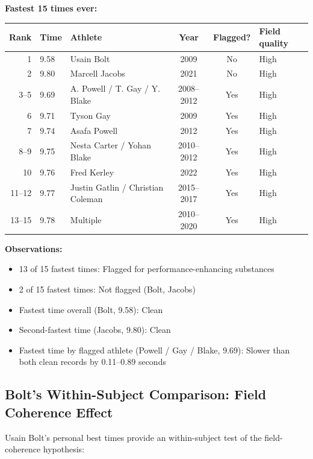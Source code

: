 \documentclass[11pt,twocolumn]{article}
\theoremstyle{definition}
\theoremstyle{remark}
\begin{document}
\textbf{Fastest 15 times ever:}
\begin{center}
\small
\begin{tabular}{rllccl}
\toprule
\textbf{Rank} & \textbf{Time} & \textbf{Athlete} & \textbf{Year} & \textbf{Flagged?} & \textbf{Field quality} \\
\midrule
1 & 9.58 & Usain Bolt & 2009 & No & High \\
2 & 9.80 & Marcell Jacobs & 2021 & No & High \\
3--5 & 9.69 & A. Powell / T. Gay / Y. Blake & 2008--2012 & Yes & High \\
6 & 9.71 & Tyson Gay & 2009 & Yes & High \\
7 & 9.74 & Asafa Powell & 2012 & Yes & High \\
8--9 & 9.75 & Nesta Carter / Yohan Blake & 2010--2012 & Yes & High \\
10 & 9.76 & Fred Kerley & 2022 & Yes & High \\
11--12 & 9.77 & Justin Gatlin / Christian Coleman & 2015--2017 & Yes & High \\
13--15 & 9.78 & Multiple & 2010--2020 & Yes & High \\
\bottomrule
\end{tabular}
\end{center}

\textbf{Observations:}
\begin{itemize}[leftmargin=1.2em]
\item 13 of 15 fastest times: Flagged for performance-enhancing substances
\item 2 of 15 fastest times: Not flagged (Bolt, Jacobs)
\item Fastest time overall (Bolt, 9.58): Clean
\item Second-fastest time (Jacobs, 9.80): Clean
\item Fastest time by flagged athlete (Powell / Gay / Blake, 9.69): Slower than both clean records by 0.11--0.89 seconds
\end{itemize}

\subsection{Bolt's Within-Subject Comparison: Field Coherence Effect}

Usain Bolt's personal best times provide an within-subject test of the field-coherence hypothesis:
\end{document}
